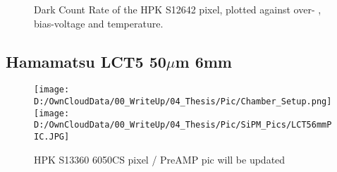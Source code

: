 \documentclass[article,type=msc,colorback,accentcolor=tud9c]{tudthesis}
\begin{document}
\begin{figure}[h]
\begin{centering}
\caption{Dark Count Rate of the HPK S12642 pixel, plotted against over- , bias-voltage and temperature.}
\label{fig:S12642_OCT}
\end{centering}
\end{figure}
\begin{figure}[h]
\begin{centering}
\caption{}
\label{fig:}
\end{centering}
\end{figure}





\newpage
\subsection{Hamamatsu LCT5 50$\mu$m 6mm}
\label{subsec:LCT56}
\begin{wrapfigure}{R}{0.65\textwidth}
\centering
\texttt{[image: D:/OwnCloudData/00\_WriteUp/04\_Thesis/Pic/Chamber\_Setup.png]}
\texttt{[image: D:/OwnCloudData/00\_WriteUp/04\_Thesis/Pic/SiPM\_Pics/LCT56mmPIC.JPG]}
\caption{\label{fig:S13360_pixel}HPK S13360 6050CS pixel / PreAMP pic will be updated}
\end{wrapfigure}
\end{document}
